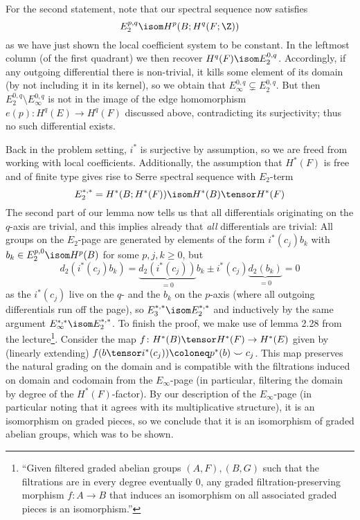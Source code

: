 \begin{solution}
\begin{smallproof}
		For the second statement, note that our spectral sequence now satisfies
		\begin{equation*}
			E_2^{p, q} \isom H^p(B; H^q(F; \Z))
		\end{equation*}
		as we have just shown the local coefficient system to be constant.
		In the leftmost column (of the first quadrant) we then recover $H^q(F) \isom E_2^{0, q}$.
		Accordingly, if any outgoing differential there is non-trivial, it kills some element of its domain (by not including it in its kernel), so we obtain that $E_\infty^{0, q} \subsetneq E_2^{0, q}$.
		But then $E_2^{0, q} \setminus E_\infty^{0, q}$ is not in the image of the edge homomorphism $e(p)\colon H^q(E) \to H^q(F)$ discussed above, contradicting its surjectivity; thus no such differential exists.
	\end{smallproof}

	Back in the problem setting, $i^*$ is surjective by assumption, so we are freed from working with local coefficients.
	Additionally, the assumption that $H^*(F)$ is free and of finite type gives rise to Serre spectral sequence with $E_2$-term
	\begin{equation*}
		E_2^{*, *} = H^*(B; H^*(F)) \isom H^*(B) \tensor H^*(F)
	\end{equation*}
	The second part of our lemma now tells us that all differentials originating on the $q$-axis are trivial, and this implies already that \emph{all} differentials are trivial:
	All groups on the $E_2$-page are generated by elements of the form $i^*(c_j) b_k$ with $b_k \in E_2^{p, 0} \isom H^p(B)$ for some $p, j, k \geq 0$, but
	\begin{equation*}
		d_2(i^*(c_j) b_k) = \underbrace{d_2(i^*(c_j))}_{= 0} b_k \pm i^*(c_j) \underbrace{d_2(b_k)}_{= 0} = 0
	\end{equation*}
	as the $i^*(c_j)$ live on the $q$- and the $b_k$ on the $p$-axis (where all outgoing differentials run off the page), so $E_3^{*, *} \isom E_2^{*, *}$ and inductively  by the same argument $E_\infty^{*, *} \isom E_2^{*, *}$.
	To finish the proof, we make use of lemma 2.28 from the lecture\footnote{\enquote{Given filtered graded abelian groups $(A, F), (B, G)$ such that the filtrations are in every degree eventually 0, any graded filtration-preserving morphism $f\colon A \to B$ that induces an isomorphism on all associated graded pieces is an isomorphism.}}.
	Consider the map $f\colon H^*(B) \tensor H^*(F) \to H^*(E)$ given by (linearly extending) $f(b \tensor i^*(c_j)) \coloneq p^*(b) \smile c_j$.
	This map preserves the natural grading on the domain and is compatible with the filtrations induced on domain and codomain from the $E_\infty$-page (in particular, filtering the domain by degree of the $H^*(F)$-factor).
	By our description of the $E_\infty$-page (in particular noting that it agrees with its multiplicative structure), it is an isomorphism on graded pieces, so we conclude that it is an isomorphism of graded abelian groups, which was to be shown.
\end{solution}

